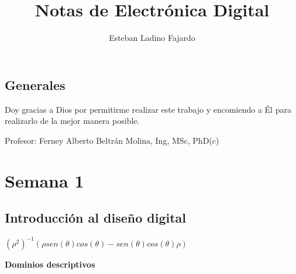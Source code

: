 \documentclass[12pt,letterpaper]{book}
\title{Notas de Electrónica Digital}
\author{Esteban Ladino Fajardo}
\begin{document}
\maketitle
\tableofcontents

\section{Generales}
Doy gracias a Dios por permitirme realizar este trabajo y encomiendo a Él para realizarlo de la mejor manera posible.


Profesor: Ferney Alberto Beltrán Molina, Ing, MSc, PhD(c)\\

\chapter{Semana 1}
\section{Introducción al diseño digital} 

$(\rho ^ 2)^{-1}(\rho sen(\theta )cos(\theta )-sen(\theta )cos(\theta )\rho ) $

\textbf{Dominios descriptivos}
\end{document}
